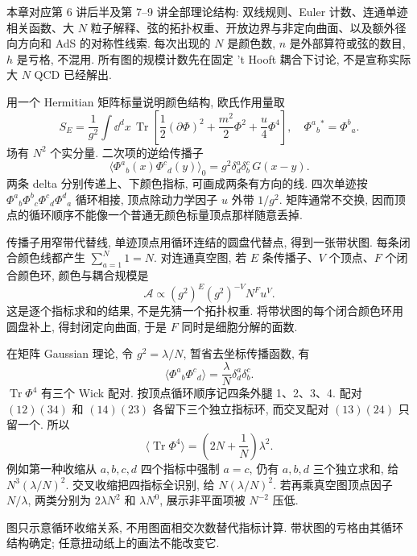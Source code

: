 \label{ch:holo-largeN-full}
本章对应第 6 讲后半及第 7--9 讲全部理论结构: 双线规则、Euler 计数、连通单迹相关函数、大 $N$ 粒子解释、弦的拓扑权重、开放边界与非定向曲面、以及额外径向方向和 AdS 的对称性线索. 每次出现的 $N$ 是颜色数, $n$ 是外部算符或弦的数目, $h$ 是亏格, 不混用. 所有图的规模计数先在固定 't Hooft 耦合下讨论, 不是宣称实际大 $N$ QCD 已经解出.

用一个 Hermitian 矩阵标量说明颜色结构, 欧氏作用量取
\[
S_E=\frac1{g^2}\int\dd^dx\,
\operatorname{Tr}\left[\frac12(\partial\Phi)^2+
\frac{m^2}2\Phi^2+\frac{u}4\Phi^4\right],
\quad \Phi^a{}_b{}^*=\Phi^b{}_a.
\]
场有 $N^2$ 个实分量. 二次项的逆给传播子
\[
\langle\Phi^a{}_b(x)\Phi^c{}_d(y)\rangle_0
=g^2\delta^a_d\delta^c_b\,G(x-y).
\]
两条 delta 分别传递上、下颜色指标, 可画成两条有方向的线. 四次单迹按 $\Phi^a{}_b\Phi^b{}_c\Phi^c{}_d\Phi^d{}_a$ 循环相接, 顶点除动力学因子 $u$ 外带 $1/g^2$. 矩阵通常不交换, 因而顶点的循环顺序不能像一个普通无颜色标量顶点那样随意丢掉.

传播子用窄带代替线, 单迹顶点用循环连结的圆盘代替点, 得到一张带状图. 每条闭合颜色线都产生 $\sum_{a=1}^N1=N$. 对连通真空图, 若 $E$ 条传播子、$V$ 个顶点、$F$ 个闭合颜色环, 颜色与耦合规模是
\[
\mathcal A\propto(g^2)^E(g^2)^{-V}N^F u^V.
\]
这是逐个指标求和的结果, 不是先猜一个拓扑权重. 将带状图的每个闭合颜色环用圆盘补上, 得封闭定向曲面, 于是 $F$ 同时是细胞分解的面数.

在矩阵 Gaussian 理论, 令 $g^2=\lambda/N$, 暂省去坐标传播函数, 有
\[
\langle\Phi^a{}_b\Phi^c{}_d\rangle
=\frac\lambda N\delta^a_d\delta^c_b.
\]
$\operatorname{Tr}\Phi^4$ 有三个 Wick 配对. 按顶点循环顺序记四条外腿 1、2、3、4. 配对 $(12)(34)$ 和 $(14)(23)$ 各留下三个独立指标环, 而交叉配对 $(13)(24)$ 只留一个. 所以
\[
\langle\operatorname{Tr}\Phi^4\rangle
=\left(2N+\frac1N\right)\lambda^2.
\]
例如第一种收缩从 $a,b,c,d$ 四个指标中强制 $a=c$, 仍有 $a,b,d$ 三个独立求和, 给 $N^3(\lambda/N)^2$. 交叉收缩把四指标全识别, 给 $N(\lambda/N)^2$. 若再乘真空图顶点因子 $N/\lambda$, 两类分别为 $2\lambda N^2$ 和 $\lambda N^0$, 展示非平面项被 $N^{-2}$ 压低.

\begin{center}
\end{center}
图只示意循环收缩关系, 不用图面相交次数替代指标计算. 带状图的亏格由其循环结构确定; 任意扭动纸上的画法不能改变它.

